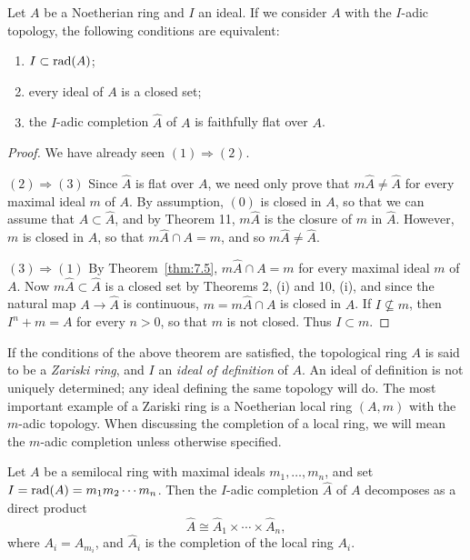 \begin{theorem}\label{thm:8.14}
Let $A$ be a Noetherian ring and $I$ an ideal. If we consider $A$
with the $I$-adic topology, the following conditions are equivalent:
\begin{enumerate}[(1)]
  \item $I \subset \operatorname{rad}(A)$;
  \item every ideal of $A$ is a closed set;
  \item the $I$-adic completion $\hat{A}$ of $A$ is faithfully flat over $A$.
\end{enumerate}
\end{theorem}

\begin{proof}
We have already seen $(1) \Rightarrow (2)$.

$(2) \Rightarrow (3)$ Since $\hat{A}$ is flat over $A$, we need only prove that $m\hat{A} \neq \hat{A}$ for every
maximal ideal $m$ of $A$. By assumption, $(0)$ is closed in $A$, so that we can
assume that $A \subset \hat{A}$, and by Theorem 11, $m\hat{A}$ is the closure of $m$ in $\hat{A}$.
However, $m$ is closed in $A$, so that $m\hat{A} \cap A = m$, and so $m\hat{A} \neq \hat{A}$.

$(3) \Rightarrow (1)$ By Theorem~\ref{thm:7.5}, $m\hat{A} \cap A = m$ for every maximal ideal $m$ of $A$.
Now $m\hat{A} \subset \hat{A}$ is a closed set by Theorems 2, (i) and 10, (i), and since the
natural map $A \to \hat{A}$ is continuous, $m = m\hat{A} \cap A$ is closed in $A$. If $I \nsubseteq m$,
then $I^n + m = A$ for every $n > 0$, so that $m$ is not closed. Thus $I \subset m$.
\end{proof}

If the conditions of the above theorem are satisfied, the topological ring $A$
is said to be a \emph{Zariski ring}, and $I$ an \emph{ideal of definition} of $A$. An
ideal of definition is not uniquely determined; any ideal defining the same
topology will do. The most important example of a Zariski ring is a Noetherian
local ring $(A, m)$ with the $m$-adic topology. When discussing the completion of a
local ring, we will mean the $m$-adic completion unless otherwise specified.

\begin{theorem}\label{thm:8.15}
Let $A$ be a semilocal ring with maximal ideals $m_1, \ldots, m_n$,
and set $I = \operatorname{rad}(A) = m_1m_2 \cdots m_n$. Then the $I$-adic completion $\hat{A}$ of $A$
decomposes as a direct product
\[
  \hat{A} \cong \hat{A}_1 \times \cdots \times \hat{A}_n,
\]
where $A_i = A_{m_i}$, and $\hat{A}_i$ is the completion of the local ring $A_i$.
\end{theorem}

